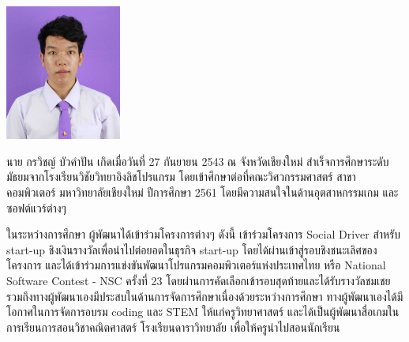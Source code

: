 \documentclass[semifinal]{cpecmu}
\author{กรวิชญ์ บัวคำปัน}{Goravit Buakampun}{610610567}
\author{กิตติพงษ์ ไมล์หรือ}{Kittipong Milerue}{610610570}
\begin{document}


\pagestyle{empty}\cleardoublepage
\normalspacing \setcounter{page}{1}  \pagestyle{cpecmu}





\ifproject

\fi



\ifproject
\appendix


\ifglossary\glossarypage\fi

\ifindex\indexpage\fi

\begin{biosketch}
\begin{center}
  \includegraphics[width=1.5in]{pic-toro/me.jpg}
\end{center}
นาย กรวิชญ์ บัวคำปัน เกิดเมื่อวันที่ 27 กันยายน 2543 ณ จังหวัดเชียงใหม่ สำเร็จการศึกษาระดับมัธยมจากโรงเรียนวิชัยวิทยาอิงลิชโปรแกรม โดยเข้าศึกษาต่อที่คณะวิศวกรรมศาสตร์ สาขาคอมพิวเตอร์ มหาวิทยาลัยเชียงใหม่ ปีการศึกษา 2561
โดยมีความสนใจในด้านอุตสาหกรรมเกม และซอฟต์แวร์ต่างๆ

ในระหว่างการศึกษา ผู้พัฒนาได้เข้าร่วมโครงการต่างๆ ดังนี้ เข้าร่วมโครงการ Social Driver สำหรับ start-up ชิงเงินรางวัลเพื่อนำไปต่อยอดในธุรกิจ start-up โดยได้ผ่านเข้าสู่รอบชิงชนะเลิศของโครงการ
และได้เข้าร่วมการแข่งขันพัฒนาโปรแกรมคอมพิวเตอร์แห่งประเทศไทย หรือ National Software Contest - NSC ครั้งที่ 23 โดยผ่านการคัดเลือกเข้ารอบสุดท้ายและได้รับรางวัลชมเชย รวมถึงทางผู้พัฒนาเองมีประสบในด้านการจัดการศึกษาเนื่องด้วยระหว่างการศึกษา
ทางผู้พัฒนาเองได้มีโอกาศในการจัดการอบรม coding และ STEM ให้แก่ครูวิทยาศาสตร์ และได้เป็นผู้พัฒนาสื่อเกมในการเรียนการสอนวิชาคณิตศาสตร์ โรงเรียนดาราวิทยาลัย เพื่อให้ครูนำไปสอนนักเรียน

\bigskip


\end{biosketch}
\end{document}
